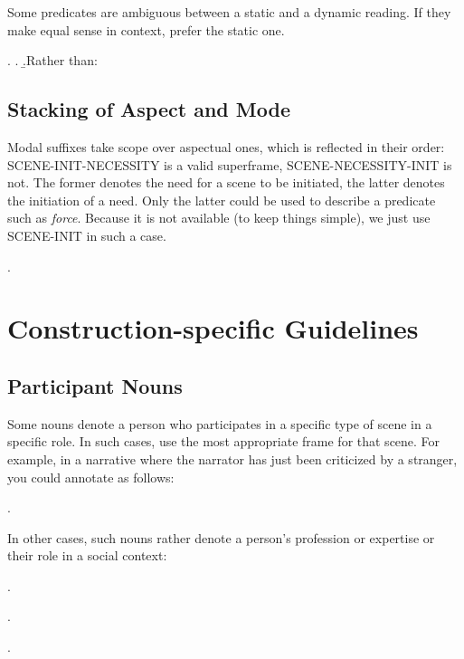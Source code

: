 \documentclass[a4paper]{article}
\newcommand{\fr}[1]{\textsf{#1}}
\begin{document}
Some predicates are ambiguous between a static and a dynamic reading. If they
make equal sense in context, prefer the static one.

\ex.
\a.
\b.Rather than: 


\newpage\subsection{Stacking of Aspect and Mode}

Modal suffixes take scope over aspectual ones, which is reflected in their order: \fr{SCENE-INIT-NECESSITY} is a valid superframe, \fr{SCENE-NECESSITY-INIT} is not. The former denotes the need for a scene to be initiated, the latter denotes the initiation of a need. Only the latter could be used to describe a predicate such as \emph{force}. Because it is not available (to keep things simple), we just use \fr{SCENE-INIT} in such a case.

\ex. 


\newpage\section{Construction-specific Guidelines}

\subsection{Participant Nouns}

Some nouns denote a person who participates in a specific type of scene in a
specific role. In such cases, use the most appropriate frame for that scene.
For example, in a narrative where the narrator has just been criticized by a
stranger, you could annotate as follows:

\ex.

In other cases, such nouns rather denote a person's profession or expertise or
their role in a social context:

\ex.

\ex.

\ex.
\end{document}
